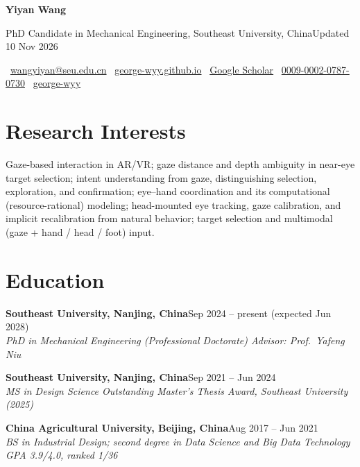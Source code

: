 \documentclass[10pt,a4paper]{article}
\newcommand{\entry}[3]{%
  \textbf{#1}\hfill{\color{muted}#2}\\
  {\itshape #3}\par\vspace{0.2ex}}
\begin{document}
{\sffamily\Huge\bfseries Yiyan Wang}\hspace{0.6em}{\Large\cjk 王以俨}\par
\vspace{0.6ex}
{\large PhD Candidate in Mechanical Engineering, Southeast University, China}\hfill{\footnotesize\color{muted}Updated 10 Nov 2026}\par
\vspace{0.8ex}
{\footnotesize
\faEnvelope\ \href{mailto:wangyiyan@seu.edu.cn}{wangyiyan@seu.edu.cn}\quad
\faGlobe\ \href{https://george-wyy.github.io}{george-wyy.github.io}\quad
\faGraduationCap\ \href{https://scholar.google.com/citations?user=Qu9RMQsAAAAJ}{Google Scholar}\quad
\faOrcid\ \href{https://orcid.org/0009-0002-0787-0730}{0009-0002-0787-0730}\quad
\faGithub\ \href{https://github.com/george-wyy}{george-wyy}}

\section{Research Interests}
Gaze-based interaction in AR/VR; gaze distance and depth ambiguity in near-eye target selection;
intent understanding from gaze, distinguishing selection, exploration, and confirmation;
eye--hand coordination and its computational (resource-rational) modeling;
head-mounted eye tracking, gaze calibration, and implicit recalibration from natural behavior;
target selection and multimodal (gaze + hand / head / foot) input.

\section{Education}
\entry{Southeast University, Nanjing, China}{Sep 2024 -- present (expected Jun 2028)}
{PhD in Mechanical Engineering (Professional Doctorate) \quad Advisor: Prof.\ Yafeng Niu}
\entry{Southeast University, Nanjing, China}{Sep 2021 -- Jun 2024}
{MS in Design Science \quad Outstanding Master's Thesis Award, Southeast University (2025)}
\entry{China Agricultural University, Beijing, China}{Aug 2017 -- Jun 2021}
{BS in Industrial Design; second degree in Data Science and Big Data Technology \quad GPA 3.9/4.0, ranked 1/36}

\end{document}
